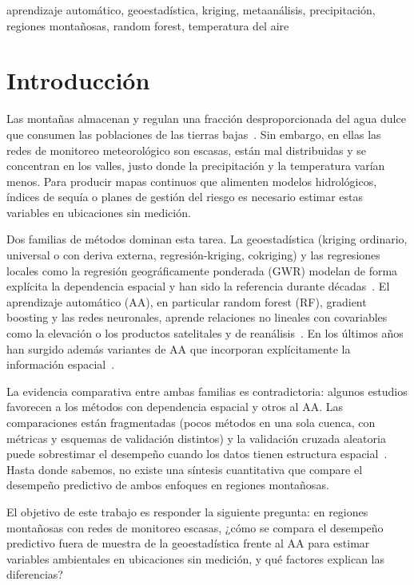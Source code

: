 \documentclass[conference]{IEEEtran}
\begin{document}
\begin{IEEEkeywords}
aprendizaje automático, geoestadística, kriging, metaanálisis, precipitación, regiones montañosas, random forest, temperatura del aire
\end{IEEEkeywords}

\section{Introducción}

Las montañas almacenan y regulan una fracción desproporcionada del agua dulce que consumen las poblaciones de las tierras bajas~\cite{viviroli2007}. Sin embargo, en ellas las redes de monitoreo meteorológico son escasas, están mal distribuidas y se concentran en los valles, justo donde la precipitación y la temperatura varían menos. Para producir mapas continuos que alimenten modelos hidrológicos, índices de sequía o planes de gestión del riesgo es necesario estimar estas variables en ubicaciones sin medición.

Dos familias de métodos dominan esta tarea. La geoestadística (kriging ordinario, universal o con deriva externa, regresión-kriging, cokriging) y las regresiones locales como la regresión geográficamente ponderada (GWR) modelan de forma explícita la dependencia espacial y han sido la referencia durante décadas~\cite{li2011}. El aprendizaje automático (AA), en particular random forest (RF), gradient boosting y las redes neuronales, aprende relaciones no lineales con covariables como la elevación o los productos satelitales y de reanálisis~\cite{appelhans2015,hengl2018}. En los últimos años han surgido además variantes de AA que incorporan explícitamente la información espacial~\cite{hengl2018,sekulic2020}.

La evidencia comparativa entre ambas familias es contradictoria: algunos estudios favorecen a los métodos con dependencia espacial y otros al AA. Las comparaciones están fragmentadas (pocos métodos en una sola cuenca, con métricas y esquemas de validación distintos) y la validación cruzada aleatoria puede sobrestimar el desempeño cuando los datos tienen estructura espacial~\cite{roberts2017,ploton2020}. Hasta donde sabemos, no existe una síntesis cuantitativa que compare el desempeño predictivo de ambos enfoques en regiones montañosas.

El objetivo de este trabajo es responder la siguiente pregunta: en regiones montañosas con redes de monitoreo escasas, ¿cómo se compara el desempeño predictivo fuera de muestra de la geoestadística frente al AA para estimar variables ambientales en ubicaciones sin medición, y qué factores explican las diferencias?
\end{document}
